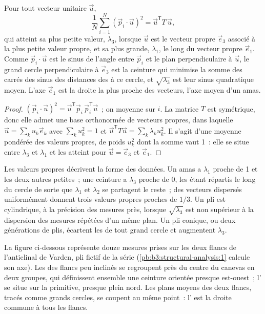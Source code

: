 \begin{theorem}\label{thm:b3:structural-analysis:tensor}
Pour tout vecteur unitaire $\vec u$,
\[
  \frac1N\sum_{i=1}^N (\vec p_i\cdot\vec u)^2 = \vec u^{\mathsf T}T\,\vec u ,
\]
qui atteint sa plus petite valeur, $\lambda_3$, lorsque $\vec u$ est le vecteur propre
$\vec e_3$ associé à la plus petite valeur propre, et sa plus grande, $\lambda_1$, le long du
vecteur propre $\vec e_1$. Comme $\vec p_i\cdot\vec u$ est le sinus de l'angle
entre $\vec p_i$ et le plan perpendiculaire à $\vec u$, le grand cercle
perpendiculaire à $\vec e_3$ est la ceinture qui minimise la somme des carrés des
sinus des distances des  à ce cercle, et $\sqrt{\lambda_3}$ est leur
sinus quadratique moyen. L'axe $\vec e_1$ est la droite la plus proche des vecteurs,
l'axe moyen d'un amas.
\end{theorem}

\begin{proof}
$(\vec p_i\cdot\vec u)^2 = \vec u^{\mathsf T}\vec p_i\,\vec p_i^{\mathsf T}\vec
u$~; on moyenne sur $i$. La matrice $T$ est symétrique, donc elle admet une base orthonormée
de vecteurs propres, dans laquelle $\vec u = \sum_k u_k\vec e_k$ avec $\sum_k
u_k^2 = 1$ et $\vec u^{\mathsf T}T\vec u = \sum_k\lambda_k u_k^2$. Il s'agit d'une
moyenne pondérée des valeurs propres, de poids $u_k^2$ dont la somme vaut 1~: elle
se situe entre $\lambda_3$ et $\lambda_1$ et les atteint pour $\vec u = \vec
e_3$ et $\vec e_1$.
\end{proof}

Les valeurs propres décrivent la forme des données. Un amas a $\lambda_1$ proche de
1 et les deux autres petites~; une ceinture a $\lambda_3$ proche de 0, les  étant
répartis le long du cercle de sorte que $\lambda_1$ et $\lambda_2$ se partagent le reste~;
des vecteurs dispersés uniformément donnent trois valeurs propres proches de $1/3$. Un pli est
cylindrique, à la précision des mesures près, lorsque $\sqrt{\lambda_3}$ est
non supérieur à la dispersion des mesures répétées d'un même plan. Un pli conique,
ou deux générations de plis, écartent les  de tout grand cercle
et augmentent $\lambda_3$.

La figure ci-dessous représente douze mesures prises sur les deux flancs de l'anticlinal
de Varden, pli fictif de la série (\cref{pb:b3:structural-analysis:1}
calcule son axe). Les  des flancs peu inclinés se regroupent près du centre du
canevas en deux groupes, qui définissent ensemble une ceinture orientée presque
est-ouest~; l' se situe sur la primitive, presque plein nord. Les plans moyens
des deux flancs, tracés comme grands cercles, se coupent au même point~:
l' est la droite commune à tous les flancs.

